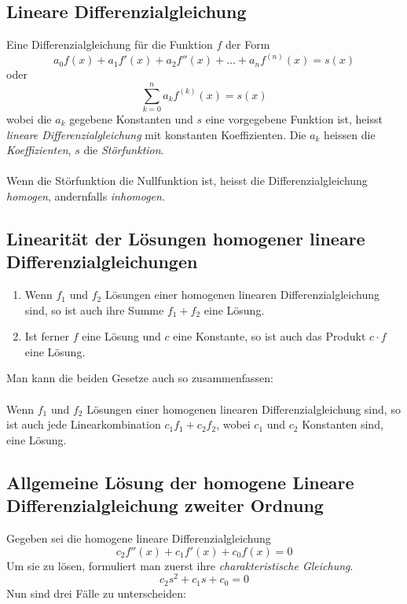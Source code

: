 \documentclass[10pt,a4paper]{scrartcl}
\begin{document}
\subsection{Lineare Differenzialgleichung}

Eine Differenzialgleichung für die Funktion $f$ der Form
$$a_0 f(x) + a_1 f'(x) + a_2 f''(x) + \dots + a_n f^{(n)}(x) = s(x)$$
oder
$$\sum\limits_{k=0}^n a_k f^{(k)}(x) = s(x)$$
wobei die $a_k$ gegebene Konstanten und $s$ eine vorgegebene
Funktion ist, heisst \textit{lineare Differenzialgleichung}
mit konstanten Koeffizienten. Die $a_k$ heissen die
\textit{Koeffizienten}, $s$ die \textit{Störfunktion}.\\\\
Wenn die Störfunktion die Nullfunktion ist, heisst die
Differenzialgleichung \textit{homogen}, andernfalls
\textit{inhomogen}.


\subsection{Linearität der Lösungen homogener lineare Differenzialgleichungen}

\begin{enumerate}
\item Wenn $f_1$ und $f_2$ Lösungen einer homogenen linearen
Differenzialgleichung sind, so ist auch ihre Summe $f_1 + f_2$
eine Lösung.
\item Ist ferner $f$ eine Lösung und $c$ eine Konstante,
so ist auch das Produkt $c \cdot f$ eine Lösung.
\end{enumerate}
Man kann die beiden Gesetze auch so zusammenfassen:\\\\
Wenn $f_1$ und $f_2$ Lösungen einer homogenen linearen
Differenzialgleichung sind, so ist auch jede
Linearkombination $c_1f_1 + c_2f_2$, wobei $c_1$ und
$c_2$ Konstanten sind, eine Lösung.


\subsection{Allgemeine Lösung der homogene Lineare Differenzialgleichung zweiter Ordnung}

Gegeben sei die homogene lineare Differenzialgleichung
$$c_2f''(x) + c_1f'(x) + c_0f(x) = 0$$
Um sie zu lösen, formuliert man zuerst ihre \textit{charakteristische Gleichung}.
$$c_2s^2 + c_1s + c_0 = 0$$
Nun sind drei Fälle zu unterscheiden:
\end{document}
